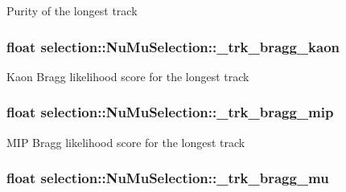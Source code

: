 Purity of the longest track \hypertarget{classselection_1_1NuMuSelection_a8fb54244ae254a42f6238bca2d7fb34e}{
\subsubsection[{\-\_\-trk\-\_\-bragg\-\_\-kaon}]{\setlength{\rightskip}{0pt plus 5cm}float selection\-::\-Nu\-Mu\-Selection\-::\-\_\-trk\-\_\-bragg\-\_\-kaon\hspace{0.3cm}{\ttfamily [private]}}}\label{classselection_1_1NuMuSelection_a8fb54244ae254a42f6238bca2d7fb34e}
Kaon Bragg likelihood score for the longest track \hypertarget{classselection_1_1NuMuSelection_acf6657ef58eba53a46c0a8c9057ff170}{
\subsubsection[{\-\_\-trk\-\_\-bragg\-\_\-mip}]{\setlength{\rightskip}{0pt plus 5cm}float selection\-::\-Nu\-Mu\-Selection\-::\-\_\-trk\-\_\-bragg\-\_\-mip\hspace{0.3cm}{\ttfamily [private]}}}\label{classselection_1_1NuMuSelection_acf6657ef58eba53a46c0a8c9057ff170}
M\-I\-P Bragg likelihood score for the longest track \hypertarget{classselection_1_1NuMuSelection_a51cf3e575038967284eb7ff10eeba9e0}{
\subsubsection[{\-\_\-trk\-\_\-bragg\-\_\-mu}]{\setlength{\rightskip}{0pt plus 5cm}float selection\-::\-Nu\-Mu\-Selection\-::\-\_\-trk\-\_\-bragg\-\_\-mu\hspace{0.3cm}{\ttfamily [private]}}}\label{classselection_1_1NuMuSelection_a51cf3e575038967284eb7ff10eeba9e0}
